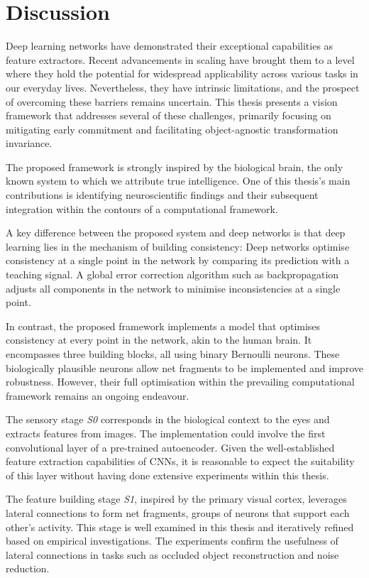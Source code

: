 \section{Discussion}
Deep learning networks have demonstrated their exceptional capabilities as feature extractors. 
Recent advancements in scaling have brought them to a level where they hold the potential for widespread applicability across various tasks in our everyday lives.
Nevertheless, they have intrinsic limitations, and the prospect of overcoming these barriers remains uncertain.
This thesis presents a vision framework that addresses several of these challenges, primarily focusing on mitigating early commitment and facilitating object-agnostic transformation invariance.

The proposed framework is strongly inspired by the biological brain, the only known system to which we attribute true intelligence.
One of this thesis's main contributions is identifying neuroscientific findings and their subsequent integration within the contours of a computational framework.

A key difference between the proposed system and deep networks is that deep learning lies in the mechanism of building consistency:
Deep networks optimise consistency at a single point in the network by comparing its prediction with a teaching signal.
A global error correction algorithm such as backpropagation adjusts all components in the network to minimise inconsistencies at a single point.

In contrast, the proposed framework implements a model that optimises consistency at every point in the network, akin to the human brain.
It encompasses three building blocks, all using binary Bernoulli neurons.
These biologically plausible neurons allow net fragments to be implemented and improve robustness. However, their full optimisation within the prevailing computational framework remains an ongoing endeavour.

The sensory stage \emph{S0} corresponds in the biological context to the eyes and extracts features from images.
The implementation could involve the first convolutional layer of a pre-trained autoencoder. Given the well-established feature extraction capabilities of CNNs, it is reasonable to expect the suitability of this layer without having done extensive experiments within this thesis.

The feature building stage \emph{S1}, inspired by the primary visual cortex, leverages lateral connections to form net fragments, groups of neurons that support each other's activity.
This stage is well examined in this thesis and iteratively refined based on empirical investigations.
The experiments confirm the usefulness of lateral connections in tasks such as occluded object reconstruction and noise reduction.

